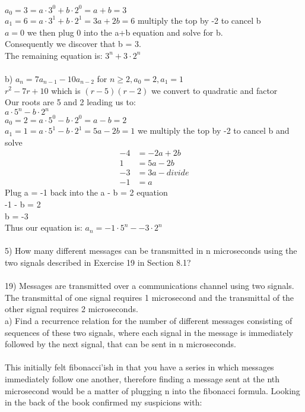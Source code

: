 \documentclass{article}
\begin{document}
\begin{flushleft}
$a_0 = 3 = a\cdot 3^0 + b \cdot 2^0 = a + b = 3$ \\
$a_1 = 6 = a\cdot 3^1 + b\cdot 2^1 = 3a + 2b = 6$ multiply the top by -2 to cancel b\\
$a = 0$ we then plug 0 into the a+b equation and solve for b. \\ 
Consequently we discover that b = 3. \\
The remaining equation is: $3^n + 3\cdot 2^n$ \\
~\\
b) $a_n = 7a_{n-1} - 10a_{n-2}$ for $n \geq 2, a_0 = 2, a_1 = 1$ \\
$ r^2 - 7r + 10 $ which is $(r-5)(r-2)$ we convert to quadratic and factor \\ 
Our roots are 5 and 2 leading us to: \\
$a \cdot 5^n - b \cdot 2^n$ \\
$a_0 = 2 = a\cdot 5^0 - b\cdot 2^0 = a - b = 2$ \\
$a_1 = 1 = a\cdot 5^1 - b\cdot 2^1 = 5a - 2b = 1$ we multiply the top by -2 to cancel b and solve
\begin{align*}
-4 &= -2a + 2b \\
1 &= 5a - 2b \\
-3 &= 3a - divide \\
-1 &= a
\end{align*}
Plug a = -1 back into the a - b = 2 equation \\ 
-1 - b = 2 \\
b = -3 \\
Thus our equation is: $a_n = -1 \cdot 5^n - -3\cdot 2^n$ \\
~\\
\setlength\parindent{0pt}5) How many different messages can be transmitted in n microseconds using the two signals described in Exercise 19 in Section 8.1? \\
~\\
19) Messages are transmitted over a communications channel using two signals.  The transmittal of one signal requires 1 microsecond and the transmittal of the other signal requires 2 microseconds.  \\
a) Find a recurrence relation for the number of different messages consisting of sequences of these two signals, where each signal in the message is immediately followed by the next signal, that can be sent in n microseconds. \\ 
~\\
This initially felt fibonacci'ish in that you have a series in which messages immediately follow one another, therefore finding a message sent at the nth microsecond would be a matter of plugging n into the fibonacci formula.  Looking in the back of the book confirmed my suspicions with: \\

\end{flushleft}
\end{document}
